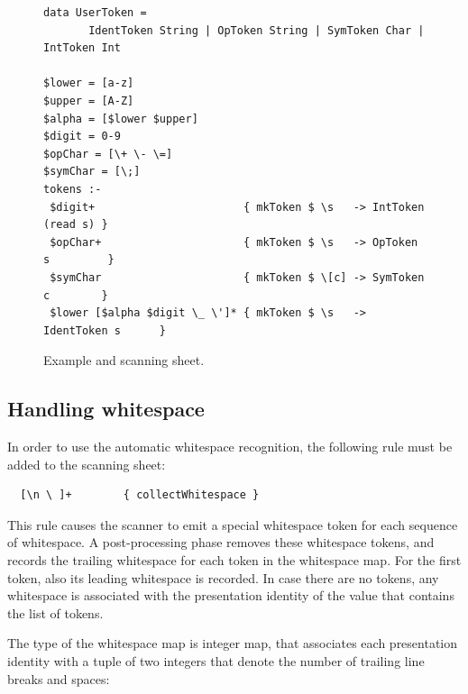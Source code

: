 \documentclass[12pt]{article}
\begin{document}
\begin{figure}
\begin{center}
\begin{footnotesize}
\begin{verbatim}
data UserToken =
       IdentToken String | OpToken String | SymToken Char | IntToken Int

$lower = [a-z]
$upper = [A-Z]
$alpha = [$lower $upper]
$digit = 0-9		
$opChar = [\+ \- \=]
$symChar = [\;]
tokens :-
 $digit+                       { mkToken $ \s   -> IntToken (read s) }
 $opChar+                      { mkToken $ \s   -> OpToken s         }
 $symChar                      { mkToken $ \[c] -> SymToken c        }
 $lower [$alpha $digit \_ \']* { mkToken $ \s   -> IdentToken s      }
\end{verbatim}
\end{footnotesize}
\caption{Example  and scanning sheet.} \label{fig:scannerSheet} 
\end{center}
\end{figure}



\subsection{Handling whitespace}

In order to use the automatic whitespace recognition, the following rule must be added to the scanning sheet: 

\begin{footnotesize}
\begin{verbatim}
  [\n \ ]+        { collectWhitespace }
\end{verbatim} %
\end{footnotesize}

This rule causes the scanner to emit a special whitespace token for each sequence of whitespace. A post-processing phase removes these whitespace tokens, and records the trailing whitespace for each token in the whitespace map. For the first token, also its leading whitespace is recorded.  In case there are no tokens, any whitespace is associated with the presentation identity of the  value that contains the list of tokens. 

The type of the whitespace map is integer map, that associates each presentation identity with a tuple of two integers that denote the number of trailing line breaks and spaces:
\end{document}
